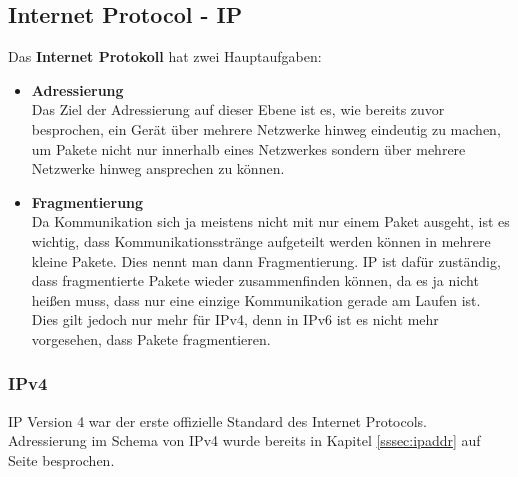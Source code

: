 \documentclass[12pt,a4paper]{report}
\begin{document}
\begin{onehalfspace}
\subsection{Internet Protocol - IP}\label{ssec:ip}
Das \textbf{Internet Protokoll} hat zwei Hauptaufgaben:
\begin{itemize}
\item \textbf{Adressierung}\\
Das Ziel der Adressierung auf dieser Ebene ist es, wie bereits zuvor besprochen, ein Gerät über mehrere Netzwerke hinweg eindeutig zu machen, um Pakete nicht nur innerhalb eines Netzwerkes sondern über mehrere Netzwerke hinweg ansprechen zu können.
\item \textbf{Fragmentierung}\\
Da Kommunikation sich ja meistens nicht mit nur einem Paket ausgeht, ist es wichtig, dass Kommunikationsstränge aufgeteilt werden können in mehrere kleine Pakete. Dies nennt man dann Fragmentierung. IP ist dafür zuständig, dass fragmentierte Pakete wieder zusammenfinden können, da es ja nicht heißen muss, dass nur eine einzige Kommunikation gerade am Laufen ist.\\
Dies gilt jedoch nur mehr für IPv4, denn in IPv6 ist es nicht mehr vorgesehen, dass Pakete fragmentieren.
\end{itemize}
\subsubsection{IPv4}
IP Version 4 war der erste offizielle Standard des Internet Protocols.\\
Adressierung im Schema von IPv4 wurde bereits in Kapitel \ref{sssec:ipaddr} auf Seite \pageref{sssec:ipaddr} besprochen.\\


\end{onehalfspace}
\end{document}

